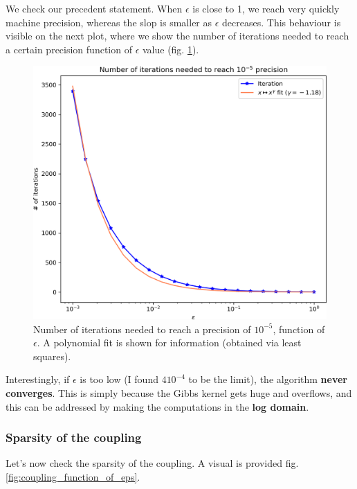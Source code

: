 We check our precedent statement. When $\epsilon$ is close to 1, we reach very quickly machine precision, whereas the slop is smaller as $\epsilon$ decreases. This behaviour is visible on the next plot, where we show the number of iterations needed to reach a certain precision function of $\epsilon$ value (fig. \ref{fig:iteration_function_of_eps}).

\begin{figure}[h]
    \centering
    \includegraphics[width=.7\textwidth]{samples/2/iteration_function_of_eps.png}
    \caption{Number of iterations needed to reach a precision of $10^{-5}$, function of $\epsilon$. A polynomial fit is shown for information (obtained via least squares).}
    \label{fig:iteration_function_of_eps}
\end{figure}

Interestingly, if $\epsilon$ is too low (I found $4 10^{-4}$ to be the limit), the algorithm \textbf{never converges}. This is simply because the Gibbs kernel gets huge and overflows, and this can be addressed by making the computations in the \textbf{log domain}. 

\subsubsection{Sparsity of the coupling}

Let's now check the sparsity of the coupling. A visual is provided fig. \ref{fig:coupling_function_of_eps}.

